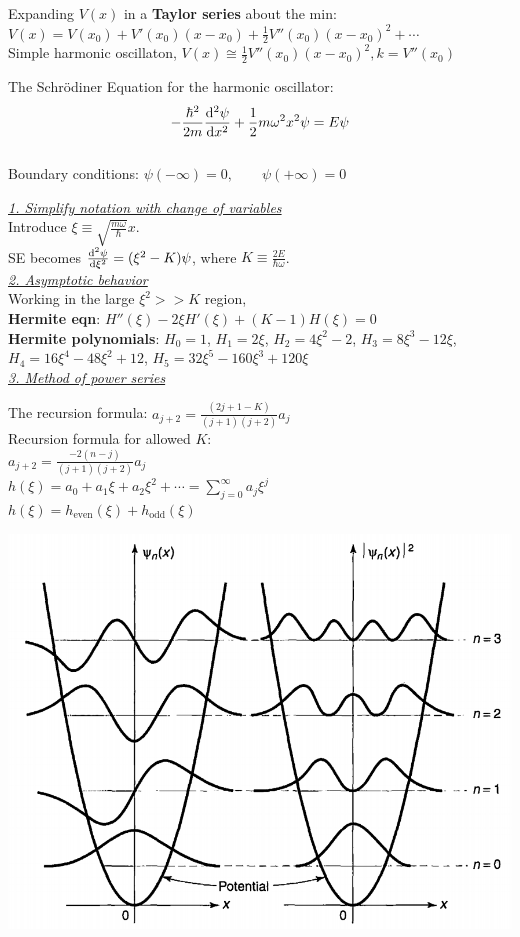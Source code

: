 Expanding $V(x)$ in a \textbf{Taylor series} about the min: $V(x) = V(x_0) + V'(x_0) (x - x_0) + \frac{1}{2} V''(x_0)(x- x_0)^2 + \cdots$ \\
Simple harmonic oscillaton, $V(x) \cong \frac{1}{2} V''(x_0) (x - x_0)^2, k = V''(x_0)$

The Schr\"{o}diner Equation for the harmonic oscillator: $$-\frac{\hbar^2}{2m} \dv[2]{\psi}{x} + \frac{1}{2} m \omega^2 x^2 \psi = E \psi$$ \\

Boundary conditions: $\psi(-\infty) = 0, \qquad \psi(+\infty) = 0$

\medskip

\textit{\underline{1. Simplify notation with change of variables}} \\
Introduce $\xi \equiv \sqrt{\frac{m \omega}{\hbar}} x$. \\
SE becomes $\dv[2]{\psi}{\xi} = (\xi^2 - K) \psi$, where $K \equiv \frac{2E}{\hbar \omega}$. \\

\textit{\underline{2. Asymptotic behavior}} \\

Working in the large $\xi^2 >> K$ region, \\
\textbf{Hermite eqn}: $H''(\xi) - 2 \xi H'(\xi) + (K - 1) H(\xi) = 0$ \\

\textbf{Hermite polynomials}: $H_0 = 1$, $H_1 = 2 \xi$, $H_2 = 4 \xi^2 - 2$, $H_3 = 8 \xi^3 - 12 \xi$, $H_4 = 16 \xi^4 - 48 \xi^2 + 12$, $H_5 = 32 \xi^5 - 160 \xi^3 + 120 \xi$ \\

\textit{\underline{3. Method of power series}}

\begin{vwcol}[widths={0.7,0.3},sep=.1cm,rule=0pt,indent=0em]

The recursion formula: $a_{j+2} = \frac{(2j + 1 - K)}{(j + 1)(j + 2)} a_j$ \\
Recursion formula for allowed $K$: \\ $a_{j+2} = \frac{-2(n - j)}{(j+1)(j+2)} a_j$ \\

$h(\xi) = a_0 + a_1 \xi + a_2 \xi^2 + \cdots = \sum_{j=0}^{\infty} a_j \xi^j$ \\
$h(\xi) = h_{\text{even}}(\xi) + h_{\text{odd}}(\xi)$ \\

\columnbreak

\vspace{-1em}
\begin{Figure}
    \raggedright
    \includegraphics[width=0.3\columnwidth]{figures/harmonic_oscillator1.png}
\end{Figure}
\vspace{-1em}

\end{vwcol}

